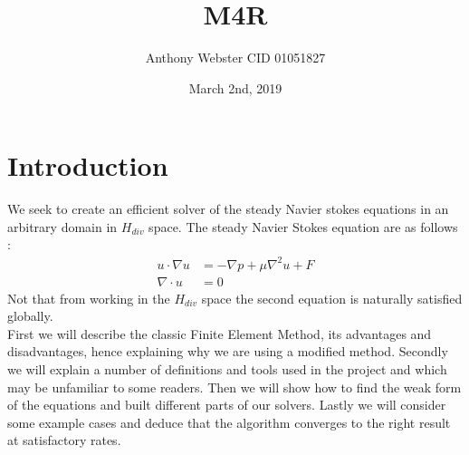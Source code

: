 \documentclass[11pt,twoside,a4paper]{article}
\begin{document}
\setcounter{secnumdepth}{0}
\title{M4R}
\date{March 2nd, 2019}
\author{Anthony Webster CID 01051827}
\maketitle
\section{Introduction}
We seek to create an efficient solver of the steady Navier stokes equations in an arbitrary domain in $H_{div}$ space. The steady Navier Stokes equation are as follows : 
\begin{align}
u \cdot \nabla u &= -\nabla p + \mu \nabla^2 u + F \\
\nabla \cdot u &= 0
\end{align}
Not that from working in the $H_{div}$ space the second equation is naturally satisfied globally.
\\
First we will describe the classic Finite Element Method, its advantages and disadvantages, hence explaining why we are using a modified method. Secondly we will explain a number of definitions and tools used in the project and which may be unfamiliar to some readers. Then we will show how to find the weak form of the equations and built different parts of our solvers. Lastly we will consider some example cases and deduce that the algorithm converges to the right result at satisfactory rates.\\
\end{document}
